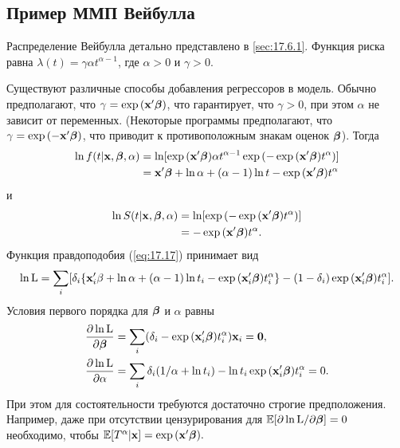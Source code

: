 \subsection{Пример ММП Вейбулла}\label{sec:17.6.5}

\noindent
Распределение Вейбулла детально представлено в \ref{sec:17.6.1}. Функция риска равна $\lambda(t)=\gamma\alpha t^{\alpha-1}$, где $\alpha>0$ и $\gamma>0$.

Существуют различные способы добавления регрессоров в модель. Обычно предполагают, что $\gamma=\exp{(\mathbf{x}'\bm{\beta})}$, что гарантирует, что $\gamma>0$, при этом $\alpha$ не зависит от переменных. (Некоторые программы предполагают, что $\gamma=\exp{(-\mathbf{x}'\bm{\beta})}$, что приводит к противоположным знакам оценок $\bm{\beta}$). Тогда
        \begin{align}
        \ln f(t|\mathbf{x},\bm{\beta},\alpha)&=\ln[\exp{(\mathbf{x}'\bm{\beta})}\alpha t^{\alpha-1}\exp{(-\exp{(\mathbf{x}'\bm{\beta})}t^{\alpha})}]\notag\\
                                        &=\mathbf{x}'\bm{\beta}+\ln\alpha+(\alpha-1)\ln t-\exp{(\mathbf{x}'\bm{\beta})t^{\alpha}}\notag
        \end{align}
и
        \begin{align}
        \ln S(t|\mathbf{x},\bm{\beta},\alpha)&=\ln[\exp{(-\exp{(\mathbf{x}'\bm{\beta})}t^{\alpha})}]\notag\\
                                        &=-\exp{(\mathbf{x}'\bm{\beta})t^{\alpha}}.\notag
        \end{align}
Функция правдоподобия (\ref{eq:17.17}) принимает вид
        \begin{align}
        \label{eq:17.19}
        \ln \mathrm{L}=\sum_i[\delta_i\{\mathbf{x}_i'\beta+\ln\alpha+(\alpha-1)\ln t_i-\exp{(\mathbf{x}_i'\bm{\beta})t_i^{\alpha}}\}-(1-\delta_i)\exp{(\mathbf{x}_i'\bm{\beta})t_i^{\alpha}}].
        \end{align}
Условия первого порядка для $\bm{\beta}$ и $\alpha$ равны
        \begin{align}
        \frac{\partial\ln\mathrm{L}}{\partial\bm{\beta}}&=\sum_i(\delta_i-\exp{(\mathbf{x}_i'\bm{\beta})t_i^{\alpha}})\mathbf{x}_i=\mathbf{0},\notag\\
        \frac{\partial\ln\mathrm{L}}{\partial\alpha}&=\sum_i\delta_i(1/\alpha+\ln t_i)-\ln t_i\exp{(\mathbf{x}_i'\bm{\beta})t_i^{\alpha}}=0.\notag
        \end{align}
При этом для состоятельности требуются достаточно строгие предположения. Например, даже при отсутствии цензурирования для $\mathbb{E}[\partial\ln\mathrm{L}/\partial\bm{\beta}]=0$ необходимо, чтобы $\mathbb{E}[T^{\alpha}|\mathbf{x}]=\exp{(\mathbf{x}'\bm{\beta})}.$


